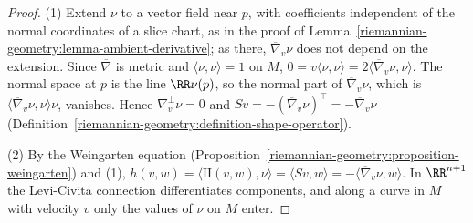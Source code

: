 \begin{proof}
(1) Extend $\nu$ to a vector field near $p$, with coefficients independent of the normal coordinates of a slice chart, as in the proof of Lemma~\ref{riemannian-geometry:lemma-ambient-derivative}; as there, $\overline{\nabla}_v\nu$ does not depend on the extension. Since $\overline{\nabla}$ is metric and $\langle\nu, \nu\rangle = 1$ on $M$,
$0 = v\langle\nu, \nu\rangle = 2\langle\overline{\nabla}_v\nu, \nu\rangle$. The normal space at $p$ is the line $\RR\nu(p)$, so the normal part of $\overline{\nabla}_v\nu$, which is $\langle\overline{\nabla}_v\nu, \nu\rangle\nu$, vanishes.
Hence $\nabla^\perp_v\nu = 0$ and $S v = -(\overline{\nabla}_v\nu)^\top = -\overline{\nabla}_v\nu$ (Definition~\ref{riemannian-geometry:definition-shape-operator}).

(2) By the Weingarten equation (Proposition~\ref{riemannian-geometry:proposition-weingarten}) and (1), $h(v, w) = \langle\mathrm{II}(v, w), \nu\rangle = \langle S v, w\rangle = -\langle\overline{\nabla}_v\nu, w\rangle$. In $\RR^{n+1}$ the
Levi-Civita connection differentiates components, and along a curve in $M$ with velocity $v$ only the values of $\nu$ on $M$ enter.
\end{proof}

